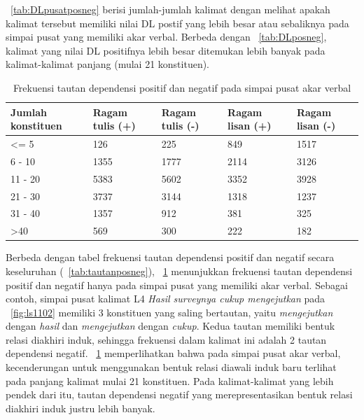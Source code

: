 \tab~\ref{tab:DLpusatposneg} berisi jumlah-jumlah kalimat dengan melihat apakah kalimat tersebut memiliki nilai DL postif yang lebih besar atau sebaliknya pada simpai pusat yang memiliki akar verbal. Berbeda dengan \tab~\ref{tab:DLposneg}, kalimat yang nilai DL positifnya lebih besar ditemukan lebih banyak pada kalimat-kalimat panjang (mulai 21 konstituen). 

\begin{table}
\begin{center}
\begin{small}
\caption{Frekuensi tautan dependensi positif dan negatif pada simpai pusat akar verbal}  \label{tab:tautanpusatposneg}
\begin{tabular}{ | p{2cm} | p{2cm} | p{2cm} | p{2cm} | p{2cm} |}
    \hline
Jumlah konstituen & Ragam tulis (+) & Ragam tulis (-) & Ragam lisan (+) & Ragam lisan (-) \\ \hline
\textless= 5 & 126 & 225 & 849 & 1517 \\ \hline
6 - 10 & 1355 & 1777 & 2114 & 3126 \\ \hline
11 - 20 & 5383 & 5602 & 3352 & 3928 \\ \hline
21 - 30 & 3737 & 3144 & 1318 & 1237 \\ \hline
31 - 40 & 1357 & 912 & 381 & 325 \\ \hline
\textgreater 40 & 569 & 300 & 222 & 182 \\ \hline
   \end{tabular}
   \end{small}
\end{center}
\end{table}

Berbeda dengan tabel frekuensi tautan dependensi positif dan negatif secara keseluruhan (\tab~\ref{tab:tautanposneg}), \tab~\ref{tab:tautanpusatposneg} menunjukkan frekuensi tautan dependensi positif dan negatif hanya pada simpai pusat yang memiliki akar verbal. Sebagai contoh, simpai pusat kalimat L4 \textit{Hasil surveynya cukup mengejutkan} pada \pic~\ref{fig:ls1102} memiliki 3 konstituen yang saling bertautan, yaitu \textit{mengejutkan} dengan \textit{hasil} dan \textit{mengejutkan} dengan \textit{cukup}. Kedua tautan memiliki bentuk relasi diakhiri induk, sehingga frekuensi dalam kalimat ini adalah 2 tautan dependensi negatif. \tab~\ref{tab:tautanpusatposneg} memperlihatkan bahwa pada simpai pusat akar verbal, kecenderungan untuk menggunakan bentuk relasi diawali induk baru terlihat pada panjang kalimat mulai 21 konstituen. Pada kalimat-kalimat yang lebih pendek dari itu, tautan dependensi negatif yang merepresentasikan bentuk relasi diakhiri induk justru lebih banyak. 


